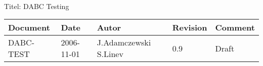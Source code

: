 \\Titel: DABC Testing
\begin{table}[h]
\begin{tabular}{|p{2.5cm}|p{2.0cm}|p{3.0cm}|p{1.6cm}|p{5.0cm}|} \hline
Document   & Date        & Autor       & Revision & Comment \\
\hline DABC-TEST & 2006-11-01 & J.Adamczewski S.Linev & 0.9 &
Draft
\\ \hline
\end{tabular}
\end{table}
